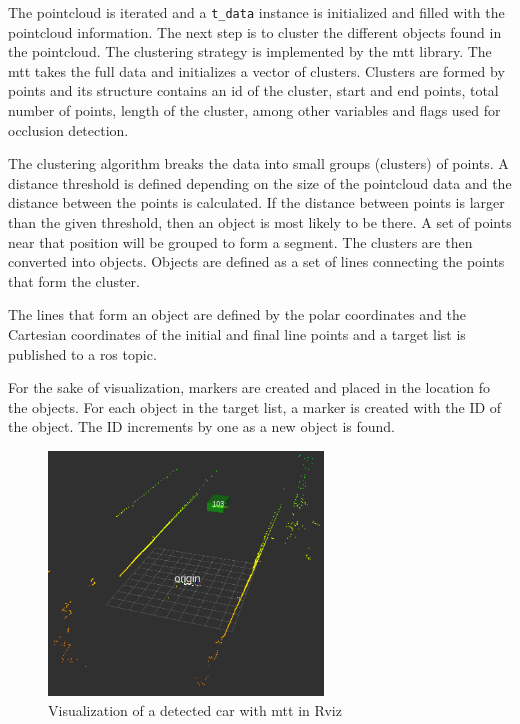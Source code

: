 The pointcloud is iterated and a \texttt{t\_data} instance is initialized and filled with the pointcloud information. The next step is to cluster the different objects found in the pointcloud. The clustering strategy is implemented by the \gls{mtt} library. The \gls{mtt} takes the full data and initializes a vector of clusters. Clusters are formed by points and its structure contains an id of the cluster, start and end points, total number of points, length of the cluster, among other variables and flags used for occlusion detection.

The clustering algorithm breaks the data into small groups (clusters) of points. A distance threshold is defined depending on the size of the pointcloud data and the distance between the points is calculated. If the distance between points is larger than the given threshold, then an object is most likely to be there. A set of points near that position will be grouped to form a segment. The clusters are then converted into objects. Objects are defined as a set of lines connecting the points that form the cluster. 

The lines that form an object are defined by the polar coordinates and the Cartesian coordinates of the initial and final line points and a target list is published to a \gls{ros} topic. 

For the sake of visualization, markers are created and placed in the location fo the objects. For each object in the target list, a marker is created with the ID of the object. The ID increments by one as a new object is found. 

\begin{figure}[htp]
	
	\centering
	\includegraphics[width=0.65\textwidth]{caplabel/imgs/rviz1.png}
	
	\caption{Visualization of a detected car with \gls{mtt} in Rviz}
	\label{fig:rviz1}
	
\end{figure}

